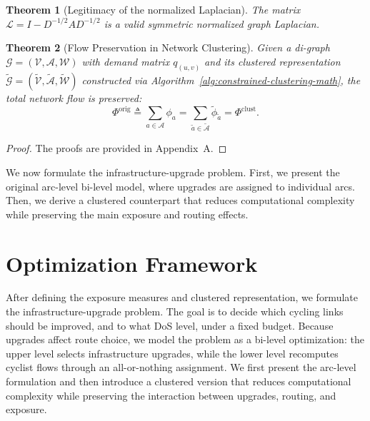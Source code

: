 \documentclass[lettersize,journal]{IEEEtran}
\newtheorem{theorem}{\normalfont\textbf{Theorem}}
\begin{document}
\begin{theorem}[Legitimacy of the normalized Laplacian]
\label{thm:symmetry}
The matrix $\mathcal{L}=I-D^{-1/2}AD^{-1/2}$ is a valid symmetric normalized graph Laplacian.
\end{theorem}


\begin{theorem}[Flow Preservation in Network Clustering]
\label{thm:flow_preservation}
Given a di-graph $\mathcal{G} = (\mathcal{V}, \mathcal{A}, \mathcal{W})$ with demand matrix $q_{(u,v)}$ and its clustered representation $\tilde{\mathcal{G}} = (\tilde{\mathcal{V}}, \tilde{\mathcal{A}}, \tilde{\mathcal{W}})$ constructed via Algorithm~\ref{alg:constrained-clustering-math}, the total network flow is preserved:
\[
\Phi^{\text{orig}} \triangleq \sum_{a \in \mathcal{A}} \phi_a
= \sum_{\tilde{a} \in \tilde{\mathcal{A}}} \tilde{\phi}_{\tilde{a}}
= \Phi^{\text{clust}}.
\]
\end{theorem}

\begin{proof}
The proofs are provided in Appendix~A.
\end{proof}





We now formulate the infrastructure-upgrade problem. First, we present the original arc-level bi-level model, where upgrades are assigned to individual arcs. Then, we derive a clustered counterpart that reduces computational complexity while preserving the main exposure and routing effects.


\section{Optimization Framework}
\label{sec:optimization_framework}

After defining the exposure measures and clustered representation, we formulate
the infrastructure-upgrade problem. The goal is to decide which cycling links
should be improved, and to what DoS level, under a fixed budget. Because
upgrades affect route choice, we model the problem as a bi-level optimization:
the upper level selects infrastructure upgrades, while the lower level recomputes
cyclist flows through an all-or-nothing assignment. We first present the
arc-level formulation and then introduce a clustered version that reduces
computational complexity while preserving the interaction between upgrades,
routing, and exposure.
\end{document}
